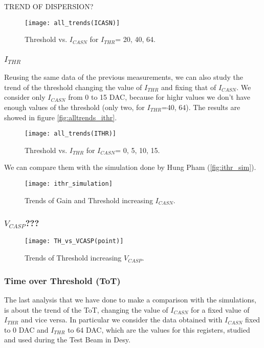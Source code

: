 TREND OF DISPERSION?

\begin{figure}[h!]
\centering
\texttt{[image: all\_trends(ICASN)]}
\caption{Threshold vs. $I_{CASN}$ for $I_{THR}$= 20, 40, 64.}
\label{fig:alltrends_icasn}
\end{figure}

\subsubsection{$I_{THR}$}

Reusing the same data of the previous measurements, we can also study the trend of the threshold changing the value of $I_{THR}$ and fixing that of $I_{CASN}$. We consider only $I_{CASN}$ from 0 to 15 DAC, because for highr values we don't have enough values of the threshold (only two, for $I_{THR}$=40, 64). The results are showed in figure \vref{fig:alltrends_ithr}.

\begin{figure}[h!]
\centering
\texttt{[image: all\_trends(ITHR)]}
\caption{Threshold vs. $I_{THR}$ for $I_{CASN}$= 0, 5, 10, 15.}
\label{fig:alltrends_ithr}
\end{figure}

We can compare them with the simulation done by Hung Pham (\vref{fig:ithr_sim}). 

\begin{figure}[h!]
\centering
\texttt{[image: ithr\_simulation]}
\caption{Trends of Gain and Threshold increasing $I_{CASN}$.}
\label{fig:ithr_sim}
\end{figure}

\subsubsection{$V_{CASP}$???}

\begin{figure}[h!]
\centering
\texttt{[image: TH\_vs\_VCASP(point)]}
\caption{Trends of Threshold increasing $V_{CASP}$.}
\label{fig:th_vs_casp}
\end{figure}



\subsubsection{Time over Threshold (ToT)}

The last analysis that we have done to make a comparison with the simulations, is about the trend of the ToT, changing the value of $I_{CASN}$ for a fixed value of $I_{THR}$ and vice versa. In particular we consider the data obtained with $I_{CASN}$ fixed to 0 DAC and $I_{THR}$ to 64 DAC, which are the values for this registers, studied and used during the Test Beam in Desy.

